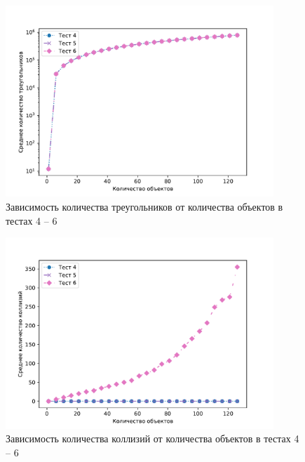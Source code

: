 \begin{figure}[H]
	\centering
    \includegraphics[width=0.9\textwidth]{img/456/plot_triangles.pdf}
	\caption{Зависимость количества треугольников от количества объектов в тестах 4 -- 6}
	\label{fig:456:tr}
\end{figure}

\begin{figure}[H]
	\centering
    \includegraphics[width=0.9\textwidth]{img/456/plot_collisions.pdf}
	\caption{Зависимость количества коллизий от количества объектов в тестах 4 -- 6}
	\label{fig:456:col}
\end{figure}

